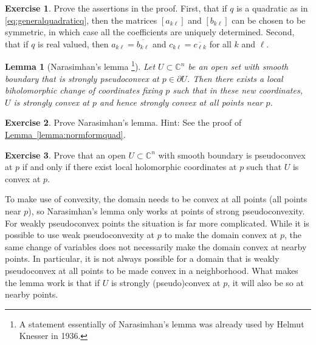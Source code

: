 \documentclass[12pt,openany]{book}
\newcommand{\C}{{\mathbb{C}}}
\theoremstyle{plain}
\newtheorem{lemma}[thm]{Lemma}
\theoremstyle{remark}
\theoremstyle{definition}
\newenvironment{exbox}{%
    \def\FrameCommand{\vrule width 1pt \relax\hspace{10pt}}%
    \MakeFramed{\advance\hsize-\width\FrameRestore}%
}{%
    \endMakeFramed
}
\theoremstyle{exercise}
\newtheorem{exercise}{Exercise}[section]
\theoremstyle{example}
\newcommand{\lemmaref}[1]{\hyperref[#1]{Lemma~\ref*{#1}}}
\begin{document}
\begin{exbox}
\begin{exercise}
Prove the assertions in the proof.  First, that if $q$ is a quadratic as in
\eqref{eq:generalquadraticq}, then the matrices
$[a_{k\ell}]$ and
$[b_{k\ell}]$ can be chosen to be symmetric, in which case
all the coefficients are uniquely determined.
Second, that if $q$ is real valued, then
 $a_{k\ell} = \overline{b_{k\ell}}$ and $c_{k\ell} = \overline{c_{\ell k}}$
for all $k$ and $\ell$.
\end{exercise}
\end{exbox}

\begin{lemma}[Narasimhan's lemma%
\footnote{A statement essentially of Narasimhan's lemma was already used by Helmut
Knesser in 1936.}]
Let $U \subset \C^n$ be an open set with smooth boundary
that is strongly pseudoconvex at $p \in \partial U$.  Then there exists a local biholomorphic change of
coordinates fixing $p$ such that in these new coordinates, $U$ is strongly
convex at $p$ and hence strongly convex at all points near $p$.
\end{lemma}

\begin{exbox}
\begin{exercise}
Prove Narasimhan's lemma.  Hint: See the proof of \lemmaref{lemma:normformquad}.
\end{exercise}

\begin{exercise}
Prove that an open $U \subset \C^n$ with smooth boundary is pseudoconvex at
$p$ if and only if there exist local holomorphic coordinates at $p$ such that
$U$ is convex at $p$.
\end{exercise}
\end{exbox}

To make use of convexity, the domain needs to be convex at all points
(all points near $p$), so
Narasimhan's lemma only works at points of strong
pseudoconvexity.
For weakly pseudoconvex points the situation is far more complicated.
While it is possible to use
weak pseudoconvexity at $p$ to make the domain convex at $p$, the same
change of variables does not necessarily make the domain convex at nearby
points.  In particular, it is not always possible for a domain that is
weakly pseudoconvex at all points to be made convex in a neighborhood.
What makes the lemma work is that if
$U$ is strongly (pseudo)convex at $p$, it will also be so
at nearby points.
\end{document}
